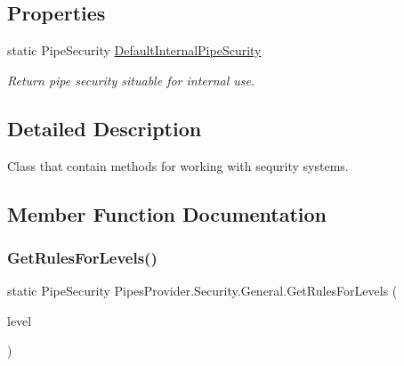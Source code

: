 \subsection*{Properties}
\begin{DoxyCompactItemize}
\item 
static Pipe\+Security \mbox{\hyperlink{class_pipes_provider_1_1_security_1_1_general_a49b6c46c031ae200885fcababfdb32c3}{Default\+Internal\+Pipe\+Scurity}}
\begin{DoxyCompactList}\small\item\em Return pipe security situable for internal use. \end{DoxyCompactList}\end{DoxyCompactItemize}


\subsection{Detailed Description}
Class that contain methods for working with sequrity systems. 



\subsection{Member Function Documentation}
\mbox{\label{class_pipes_provider_1_1_security_1_1_general_a7b89c9d059851b68df31b78c1a2e021c}} 
\subsubsection{\texorpdfstring{Get\+Rules\+For\+Levels()}{GetRulesForLevels()}}
{\footnotesize\ttfamily static Pipe\+Security Pipes\+Provider.\+Security.\+General.\+Get\+Rules\+For\+Levels (\begin{DoxyParamCaption}\item[{\mbox{\hyperlink{namespace_pipes_provider_1_1_security_a1a6020eca1c661a6f7140e8260502d7e}{Security\+Level}}}]{level }\end{DoxyParamCaption})\hspace{0.3cm}{\ttfamily [static]}}



